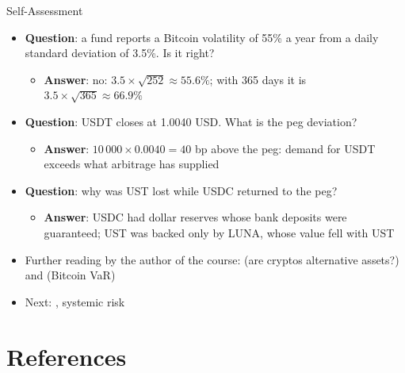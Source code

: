 \begin{frame}{Self-Assessment}
\itemsize{\small}
\begin{itemize}
    \item \textbf{Question}: a fund reports a Bitcoin volatility of 55\% a year from a daily standard deviation of 3.5\%. Is it right?
    \begin{itemize}
        \item \textbf{Answer}: no: $3.5 \times \sqrt{252} \approx 55.6\%$; with 365 days it is $3.5 \times \sqrt{365} \approx 66.9\%$
    \end{itemize}
    \item \textbf{Question}: USDT closes at 1.0040 USD. What is the peg deviation?
    \begin{itemize}
        \item \textbf{Answer}: $10\,000 \times 0.0040 = 40$ bp above the peg: demand for USDT exceeds what arbitrage has supplied
    \end{itemize}
    \item \textbf{Question}: why was UST lost while USDC returned to the peg?
    \begin{itemize}
        \item \textbf{Answer}: USDC had dollar reserves whose bank deposits were guaranteed; UST was backed only by LUNA, whose value fell with UST
    \end{itemize}
    \item Further reading by the author of the course:  (are cryptos alternative assets?) and  (Bitcoin VaR)
    \item Next: , systemic risk
\end{itemize}
\end{frame}


\section{References}

